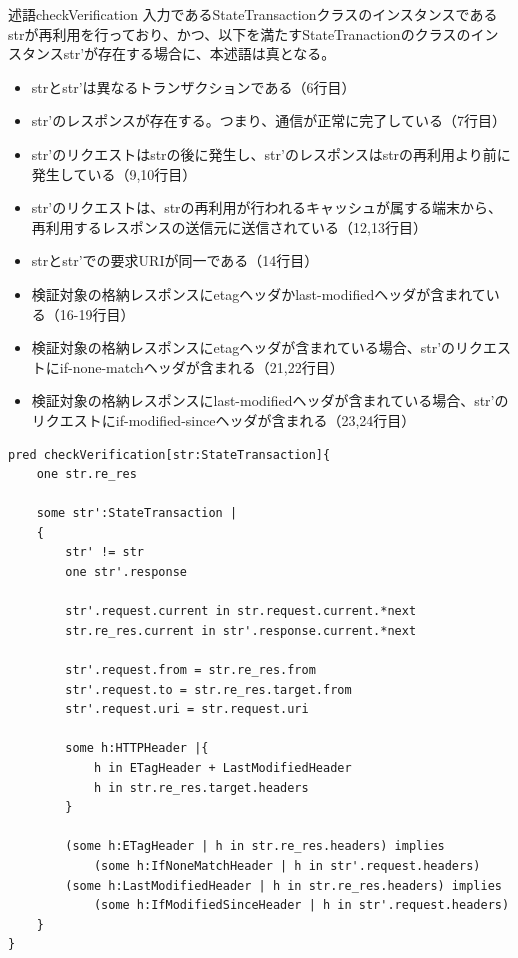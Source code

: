 \documentclass[12pt,a4paper]{jbook}
\begin{document}
\begin{itembox}[l]{述語checkVerification}
入力であるStateTransactionクラスのインスタンスであるstrが再利用を行っており、かつ、以下を満たすStateTranactionのクラスのインスタンスstr'が存在する場合に、本述語は真となる。
\begin{itemize}
\item strとstr'は異なるトランザクションである（6行目）
\item str'のレスポンスが存在する。つまり、通信が正常に完了している（7行目）
\item str'のリクエストはstrの後に発生し、str'のレスポンスはstrの再利用より前に発生している（9,10行目）
\item str'のリクエストは、strの再利用が行われるキャッシュが属する端末から、再利用するレスポンスの送信元に送信されている（12,13行目）
\item strとstr'での要求URIが同一である（14行目）
\item 検証対象の格納レスポンスにetagヘッダかlast-modifiedヘッダが含まれている（16-19行目）
\item 検証対象の格納レスポンスにetagヘッダが含まれている場合、str'のリクエストにif-none-matchヘッダが含まれる（21,22行目）
\item 検証対象の格納レスポンスにlast-modifiedヘッダが含まれている場合、str'のリクエストにif-modified-sinceヘッダが含まれる（23,24行目）
\end{itemize}
\end{itembox}

\begin{lstlisting}[caption=ある再利用が検証済みか判定する述語, label=code:checkVerification]
pred checkVerification[str:StateTransaction]{
	one str.re_res

	some str':StateTransaction |
	{
		str' != str
		one str'.response

		str'.request.current in str.request.current.*next
		str.re_res.current in str'.response.current.*next

		str'.request.from = str.re_res.from
		str'.request.to = str.re_res.target.from
		str'.request.uri = str.request.uri

		some h:HTTPHeader |{
			h in ETagHeader + LastModifiedHeader
			h in str.re_res.target.headers
		}

		(some h:ETagHeader | h in str.re_res.headers) implies
			(some h:IfNoneMatchHeader | h in str'.request.headers)
		(some h:LastModifiedHeader | h in str.re_res.headers) implies
			(some h:IfModifiedSinceHeader | h in str'.request.headers)
	}
}
\end{lstlisting}
\end{document}
